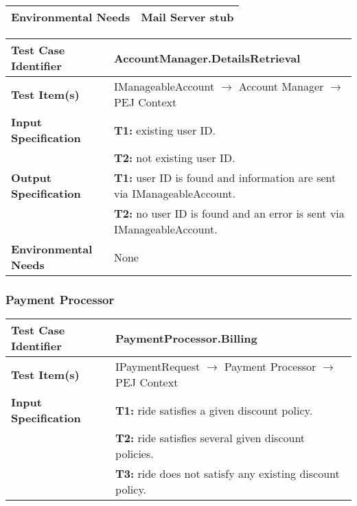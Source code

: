 {\begin{tabularx}{\textwidth}{l X}
    \textbf{Environmental Needs} & Mail Server stub\\
    \hline
\end{tabularx}
\bigskip 

\noindent
\begin{tabularx}{\textwidth}{l X}
    \hline 
    \textbf{Test Case Identifier} & AccountManager.DetailsRetrieval\\ 
    \hline 
    
    \textbf{Test Item(s)} & IManageableAccount $\rightarrow$ Account Manager $\rightarrow$ PEJ Context\\
    \hline 
    
    \textbf{Input Specification} & \textbf{T1:} existing user ID. \\
                                & \textbf{T2:} not existing user ID.\\
    \hline  
    
    \textbf{Output Specification} & \textbf{T1:} user ID is found and information are sent via IManageableAccount.\\
                                & \textbf{T2:} no user ID is found and an error is sent via IManageableAccount.\\
    \hline 
    
    
    \textbf{Environmental Needs} & None\\
    \hline
\end{tabularx}

\subsubsection{Payment Processor}
\begin{tabularx}{\textwidth}{l X}
    \hline 
    \textbf{Test Case Identifier} & PaymentProcessor.Billing\\ 
    \hline 
    
    \textbf{Test Item(s)} & IPaymentRequest $\rightarrow$ Payment Processor $\rightarrow$ PEJ Context\\
    \hline 
    
    \textbf{Input Specification} & \textbf{T1:} ride satisfies a given discount policy.\\
                                & \textbf{T2:} ride satisfies several given discount policies.\\
                                &  \textbf{T3:} ride does not satisfy any existing discount policy.\\
    \hline 
    

\end{tabularx}}
